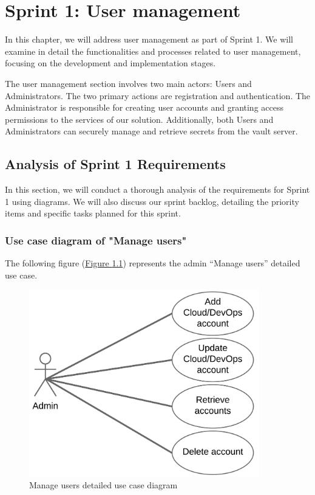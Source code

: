 \chapter{Sprint 1: User management}
In this chapter, we will address user management as part of Sprint 1. We will examine in detail the functionalities and processes related to user management, focusing on the development and implementation stages.

The user management section involves two main actors: Users and Administrators. The two primary actions are registration and authentication. The Administrator is responsible for creating user accounts and granting access permissions to the services of our solution. Additionally, both Users and Administrators can securely manage and retrieve secrets from the vault server.
\pagebreak

\section{Analysis of Sprint 1 Requirements}
In this section, we will conduct a thorough analysis of the requirements for Sprint 1 using diagrams. We will also discuss our sprint backlog, detailing the priority items and specific tasks planned for this sprint.


\subsection{Use case diagram of "Manage users"}

The following figure (\hyperref[fig:use_case-manage_users2]{Figure \ref{fig:use_case-manage_users2}})  represents the admin ``Manage users'' detailed use case.
\begin{figure}[h]
  \center
  \includegraphics[width=10cm]{./chapters/sprint1/use_case-manage_users2.png}
  \caption{Manage users detailed use case diagram}
  \label{fig:use_case-manage_users2}
\end{figure}

